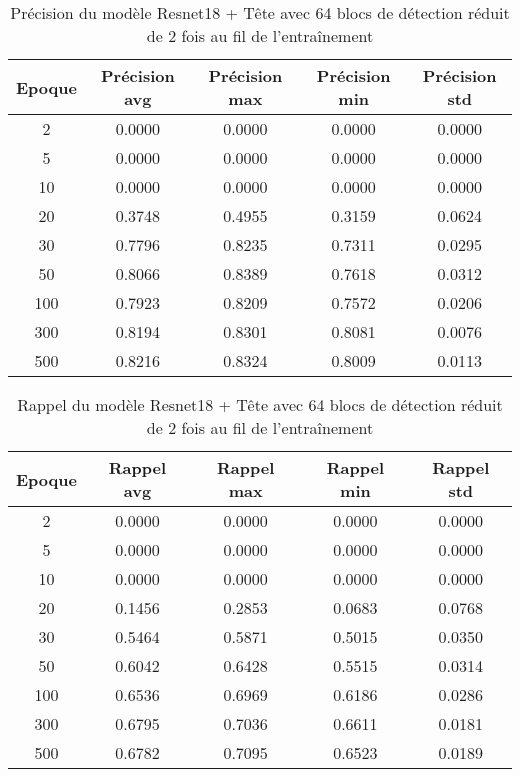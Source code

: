 \begin{table}[!ht]
    \caption{Précision du modèle Resnet18 + Tête avec 64 blocs de détection réduit de 2 fois au fil de l'entraînement}
    \label{tab:resnet18+head_64n_reduced_2x_precision}
    \centering
    \begin{tabular}{ |c||c|c|c|c|  }
        \hline
        \rowcolor{gray!50}
        Epoque & Précision avg & Précision max & Précision min & Précision std\\
        \hline
        2 & 0.0000 & 0.0000 & 0.0000 & 0.0000\\
        5 & 0.0000 & 0.0000 & 0.0000 & 0.0000\\
        10 & 0.0000 & 0.0000 & 0.0000 & 0.0000\\
        20 & 0.3748 & 0.4955 & 0.3159 & 0.0624\\
        30 & 0.7796 & 0.8235 & 0.7311 & 0.0295\\
        50 & 0.8066 & 0.8389 & 0.7618 & 0.0312\\
        100 & 0.7923 & 0.8209 & 0.7572 & 0.0206\\
        300 & 0.8194 & 0.8301 & 0.8081 & 0.0076\\
        500 & 0.8216 & 0.8324 & 0.8009 & 0.0113\\
        \hline
    \end{tabular}
\end{table}

\begin{table}[!ht]
    \caption{Rappel du modèle Resnet18 + Tête avec 64 blocs de détection réduit de 2 fois au fil de l'entraînement}
    \label{tab:resnet18+head_64n_reduced_2x_rappel}
    \centering
    \begin{tabular}{ |c||c|c|c|c|  }
        \hline
        \rowcolor{gray!50}
        Epoque & Rappel avg & Rappel max & Rappel min & Rappel std\\
        \hline
        2 & 0.0000 & 0.0000 & 0.0000 & 0.0000\\
        5 & 0.0000 & 0.0000 & 0.0000 & 0.0000\\
        10 & 0.0000 & 0.0000 & 0.0000 & 0.0000\\
        20 & 0.1456 & 0.2853 & 0.0683 & 0.0768\\
        30 & 0.5464 & 0.5871 & 0.5015 & 0.0350\\
        50 & 0.6042 & 0.6428 & 0.5515 & 0.0314\\
        100 & 0.6536 & 0.6969 & 0.6186 & 0.0286\\
        300 & 0.6795 & 0.7036 & 0.6611 & 0.0181\\
        500 & 0.6782 & 0.7095 & 0.6523 & 0.0189\\
        \hline
    \end{tabular}
\end{table}

